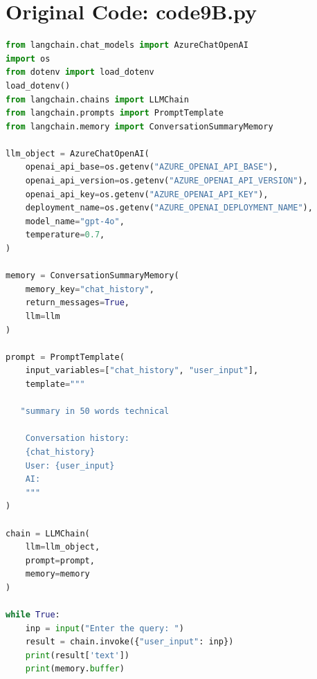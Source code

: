 \documentclass[11pt, a4paper]{article}
\begin{document}
\section{Original Code: code9B.py}
\begin{lstlisting}[language=Python]
from langchain.chat_models import AzureChatOpenAI
import os
from dotenv import load_dotenv
load_dotenv()
from langchain.chains import LLMChain
from langchain.prompts import PromptTemplate
from langchain.memory import ConversationSummaryMemory

llm_object = AzureChatOpenAI(
    openai_api_base=os.getenv("AZURE_OPENAI_API_BASE"),
    openai_api_version=os.getenv("AZURE_OPENAI_API_VERSION"),
    openai_api_key=os.getenv("AZURE_OPENAI_API_KEY"),
    deployment_name=os.getenv("AZURE_OPENAI_DEPLOYMENT_NAME"),
    model_name="gpt-4o",
    temperature=0.7,
)

memory = ConversationSummaryMemory(
    memory_key="chat_history",
    return_messages=True,
    llm=llm
)

prompt = PromptTemplate(
    input_variables=["chat_history", "user_input"],
    template="""

   "summary in 50 words technical

    Conversation history:
    {chat_history}
    User: {user_input}
    AI:
    """
)

chain = LLMChain(
    llm=llm_object,
    prompt=prompt,
    memory=memory
)

while True:
    inp = input("Enter the query: ")
    result = chain.invoke({"user_input": inp})
    print(result['text'])
    print(memory.buffer)
\end{lstlisting}
\end{document}
